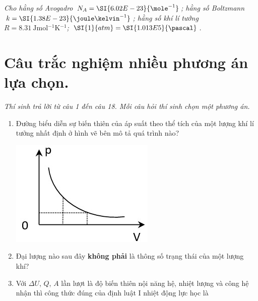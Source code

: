 \setcounter{section}{0}
\textit{Cho hằng số Avogadro $N_A=\SI{6.02E-23}{\mole^{-1}}$; hằng số Boltzmann $k=\SI{1.38E-23}{\joule\kelvin^{-1}}$; hằng số khí lí tưởng $R=\SI{8.31}{\joule\mol^{-1}\kelvin^{-1}}$; $\SI{1}{atm}=\SI{1.013E5}{\pascal}$.
}
\section{Câu trắc nghiệm nhiều phương án lựa chọn.}
\textit{Thí sinh trả lời từ câu 1 đến câu 18. Mỗi câu hỏi thí sinh chọn một phương án.}
\begin{enumerate}[label=\bfseries Câu \arabic*:, leftmargin=1.7cm]
	\item Đường biểu diễn sự biến thiên của áp suất theo thể tích của một lượng khí lí tưởng nhất định ở hình vẽ bên mô tả quá trình nào?
	\begin{center}
		\includegraphics[width=0.35\linewidth]{../figs/VN12-Y24-PH-SYL-016-1}
	\end{center}

\item Đại lượng nào sau đây \textbf{không phải} là thông số trạng thái của một lượng khí?

\item Với $\Delta U$, $Q$, $A$ lần lượt là độ biến thiên nội năng hệ, nhiệt lượng và công hệ nhận thì công thức đúng của định luật I nhiệt động lực học là


\end{enumerate}
